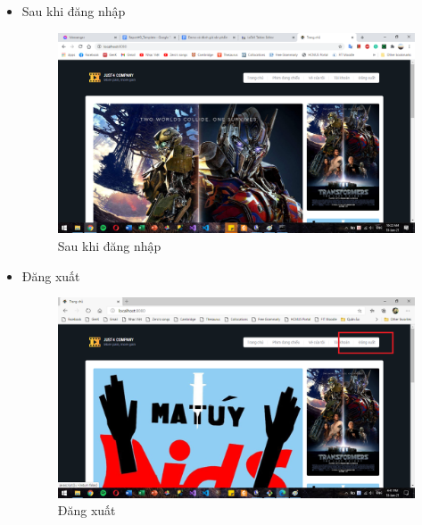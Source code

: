 \documentclass[a4paper, 12pt]{article}
\begin{document}
\begin{itemize}
	\item Sau khi đăng nhập
	\begin{figure}[H]
		\begin{center}
			\includegraphics[scale=0.5]{./image/demo_userloggedin.png}
			\caption{Sau khi đăng nhập}
		\end{center}
	\end{figure}

	\item Đăng xuất
	\begin{figure}[H]
		\begin{center}
			\includegraphics[scale=0.5]{./image/demo_logout.png}
			\caption{Đăng xuất}
		\end{center}
	\end{figure}


\end{itemize}
\end{document}
